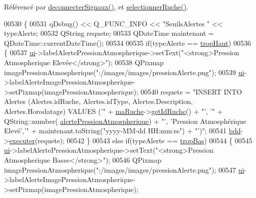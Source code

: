Référencé par \hyperlink{class_ruche_ihm_a348a76106f3072dd31a382c6025b8113}{deconnecter\+Signaux()}, et \hyperlink{class_ruche_ihm_a7324ae6ea574ccdad47783f466933157}{selectionner\+Ruche()}.


\begin{DoxyCode}
00530 \{
00531     qDebug() << Q\_FUNC\_INFO << \textcolor{stringliteral}{"SeuilsAlertes "} << typeAlerte;
00532     QString requete;
00533     QDateTime maintenant = QDateTime::currentDateTime();
00534 
00535     \textcolor{keywordflow}{if}(typeAlerte == \hyperlink{parametres_8h_aaa6de8207c94675264c90b10b613368dabc650d9700ae19f2696e6a6e3f9ab067}{tropHaut})
00536     \{
00537         \hyperlink{class_ruche_ihm_a64786058bd7f88ca2f1e9743bb27c25b}{ui}->labelAlertePressionAtmospherique->setText(\textcolor{stringliteral}{"<strong>Pression Atmospherique Elevée</strong>"});
00538         QPixmap imagePressionAtmospherique(\textcolor{stringliteral}{":/images/images/pressionAlerte.png"});
00539         \hyperlink{class_ruche_ihm_a64786058bd7f88ca2f1e9743bb27c25b}{ui}->labelAlerteImagePressionAtmospherique->setPixmap(imagePressionAtmospherique);
00540         requete = \textcolor{stringliteral}{"INSERT INTO Alertes (Alertes.idRuche, Alertes.idType, Alertes.Description,
       Alertes.Horodatage) VALUES ('"} + \hyperlink{class_ruche_ihm_a43a6b1fa31f4fba58d919daae3707b38}{maRuche}->\hyperlink{class_ruche_a9f2de5ef29557ec7a53d5e22df34d164}{getIdRuche}() + \textcolor{stringliteral}{"', '"} + QString::number(
      \hyperlink{parametres_8h_a83a725fd153179a2bd97afcc8307737ba3b3b9fe16ae965531aca47449d865ce1}{alertePressionAtmospherique}) + \textcolor{stringliteral}{"', 'Pression Atmosphérique Elevé','"} + 
      maintenant.toString(\textcolor{stringliteral}{"yyyy-MM-dd  HH:mm:ss"}) + \textcolor{stringliteral}{"')"};
00541         \hyperlink{class_ruche_ihm_a0851936fe212e8d40538264f09749153}{bdd}->\hyperlink{class_base_de_donnees_aa8de5f8f8bb17edc43f5c0ee33712081}{executer}(requete);
00542     \}
00543     \textcolor{keywordflow}{else} \textcolor{keywordflow}{if}(typeAlerte == \hyperlink{parametres_8h_aaa6de8207c94675264c90b10b613368da4257e2f8921856770c8266f55c937295}{tropBas})
00544     \{
00545         \hyperlink{class_ruche_ihm_a64786058bd7f88ca2f1e9743bb27c25b}{ui}->labelAlertePressionAtmospherique->setText(\textcolor{stringliteral}{"<strong>Pression Atmospherique Basse</strong>"});
00546         QPixmap imagePressionAtmospherique(\textcolor{stringliteral}{":/images/images/pressionAlerte.png"});
00547         \hyperlink{class_ruche_ihm_a64786058bd7f88ca2f1e9743bb27c25b}{ui}->labelAlerteImagePressionAtmospherique->setPixmap(imagePressionAtmospherique);

\end{DoxyCode}
